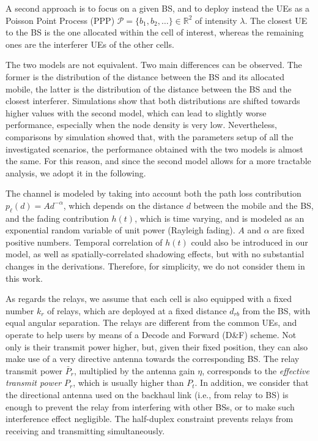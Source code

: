 \documentclass[12pt, letterpaper, onecolumn, draftcls]{IEEEtran}
\begin{document}
A second approach is to focus on a given BS, and to deploy instead the UEs as a Poisson Point Process (PPP) $\mathcal{P}=\{b_1,b_2,\ldots\}\in\mathbb{R}^2$ of intensity $\lambda$. The closest UE to the BS is the one allocated within the cell of interest, whereas the remaining ones are the interferer UEs of the other cells.



The two models are not equivalent. Two main differences can be observed. The former is the distribution of the distance between the BS and its allocated mobile, the latter is the distribution of the distance between the BS and the closest interferer.
Simulations show that both distributions are shifted towards higher values with the second model, which can lead to slightly worse performance, especially when the node density is very low.
Nevertheless, comparisons by simulation showed that, with the parameters setup of all the investigated scenarios, the performance obtained with the two models is almost the same.
For this reason, and since the second model allows for a more tractable analysis, we adopt it in the following.



The channel is modeled by taking into account both the path loss contribution $p_{\ell}(d) = A d^{-\alpha}$, which depends on the distance $d$ between the mobile and the BS, and the fading contribution $h(t)$, which is time varying,
and is modeled as an exponential random variable of unit power (Rayleigh fading). $A$ and $\alpha$ are fixed positive numbers. Temporal correlation of $h(t)$ could also be introduced in our model, as well as spatially-correlated shadowing effects, but with no substantial changes in the derivations. Therefore, for simplicity, we do not consider them in this work.

As regards the relays, we assume that each cell is also equipped with a fixed number $k_r$ of relays, which are deployed at a fixed distance $d_{rb}$ from the BS, with equal angular separation. The relays are different from the common UEs, and operate to help users by means of a Decode and Forward (D\&F) scheme. Not only is their transmit power higher, but, given their fixed position, they can also make use of a very directive antenna towards the corresponding BS.
The relay transmit power $\bar{P}_r$, multiplied by the antenna gain $\eta$, corresponds to the \textit{effective transmit power} $P_r$, which is usually higher than $P_t$. In addition, we consider that the directional antenna used on the backhaul link (i.e., from relay to BS) is enough to prevent the relay from interfering with other BSs, or to make such interference effect negligible.
The half-duplex constraint prevents relays from receiving and transmitting simultaneously.
\end{document}
